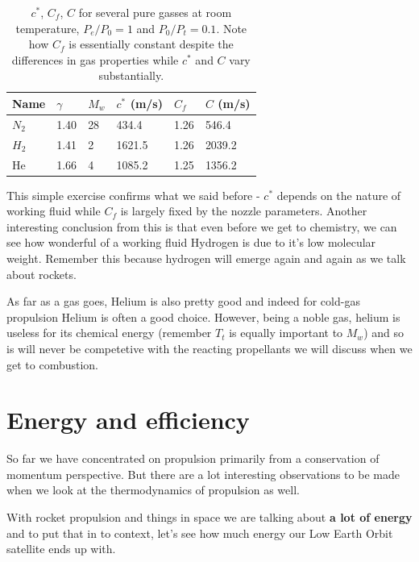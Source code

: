 \documentclass[twocolumn]{memoir} %
\begin{document}
\begin{table}[h]
\centering
\begin{tabular}{llllll}
\toprule
Name & $\gamma$ & $M_w$ & $c^*$ (m/s) & $C_f$ & $C$ (m/s) \\
\midrule
$N_2$ & 1.40 & 28 & 434.4 & 1.26 & 546.4 \\
$H_2$ & 1.41 & 2 & 1621.5 & 1.26 & 2039.2 \\
He & 1.66 & 4 & 1085.2 & 1.25 & 1356.2 \\

\bottomrule
\end{tabular}

        
\caption{$c^*$, $C_f$, $C$ for several pure gasses at room temperature,
        $P_e/P_0 = 1$ and $P_0/P_t = 0.1$. Note how $C_f$ is essentially
        constant despite the differences in gas properties while $c^*$ and
        $C$ vary substantially.}    

\end{table}

    This simple exercise confirms what we said before - $c^*$ depends on the nature of working fluid while $C_f$ is largely fixed by the nozzle parameters.  Another interesting conclusion from this is that even before we get to chemistry, we can
see how wonderful of a working fluid Hydrogen is due to it's low
molecular weight. Remember this because hydrogen will emerge again and
again as we talk about rockets.

As far as a gas goes, Helium is also pretty good and indeed for cold-gas
propulsion Helium is often a good choice. However, being a noble gas,
helium is useless for its chemical energy (remember \(T_t\) is equally
important to \(M_w\)) and so is will never be competetive with the
reacting propellants we will discuss when we get to combustion.

\section{Energy and efficiency}\label{energy-thermodynamics-and-efficiency}

So far we have concentrated on propulsion primarily from a conservation
of momentum perspective. But there are a lot interesting observations to
be made when we look at the thermodynamics of propulsion as well.

With rocket propulsion and things in space we are talking about
\textbf{a lot of energy} and to put that in to context, let's see how
much energy our Low Earth Orbit satellite ends up with.
\end{document}
